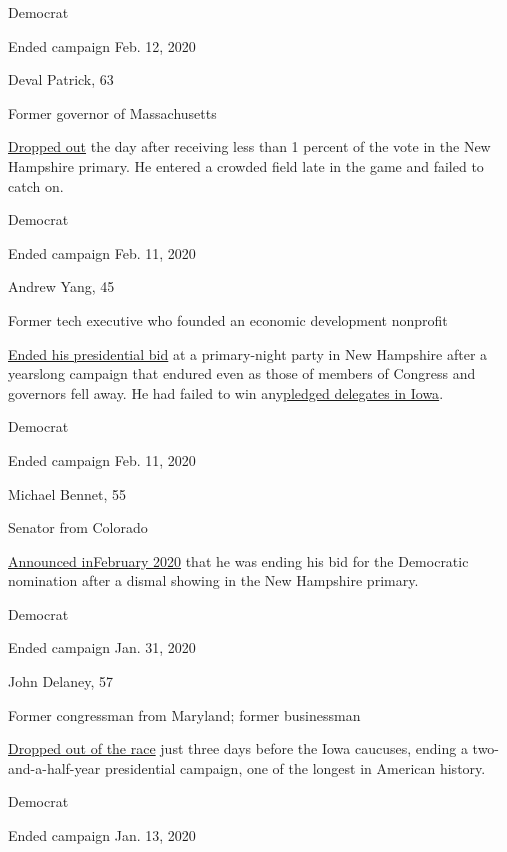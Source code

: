 Democrat

Ended campaign Feb. 12, 2020

Deval Patrick, 63

Former governor of Massachusetts

\href{https://www.nytimes.com/2020/02/12/us/politics/deval-patrick-drops-out.html}{Dropped
out} the day after receiving less than 1 percent of the vote in the New
Hampshire primary. He entered a crowded field late in the game and
failed to catch on.

Democrat

Ended campaign Feb. 11, 2020

Andrew Yang, 45

Former tech executive who founded an economic development nonprofit

\href{https://www.nytimes.com/2020/02/11/us/politics/andrew-yang-drops-out.html}{Ended
his presidential bid} at a primary-night party in New Hampshire after a
yearslong campaign that endured even as those of members of Congress and
governors fell away. He had failed to win
any\href{https://www.nytimes.com/interactive/2020/02/04/us/elections/results-iowa-caucus.html}{}\href{https://www.nytimes.com/interactive/2020/02/04/us/elections/results-iowa-caucus.html}{pledged
delegates in Iowa}.

Democrat

Ended campaign Feb. 11, 2020

Michael Bennet, 55

Senator from Colorado

\href{https://www.nytimes.com/2020/02/11/us/politics/michael-bennet-drops-out.html}{Announced
in}\href{https://www.nytimes.com/2020/02/11/us/politics/michael-bennet-drops-out.html}{February
2020} that he was ending his bid for the Democratic nomination after a
dismal showing in the New Hampshire primary.

Democrat

Ended campaign Jan. 31, 2020

John Delaney, 57

Former congressman from Maryland; former businessman

\href{https://www.nytimes.com/2020/01/31/us/politics/john-delaney-drops-out.html}{Dropped
out of the race} just three days before the Iowa caucuses, ending a
two-and-a-half-year presidential campaign, one of the longest in
American history.

Democrat

Ended campaign Jan. 13, 2020

